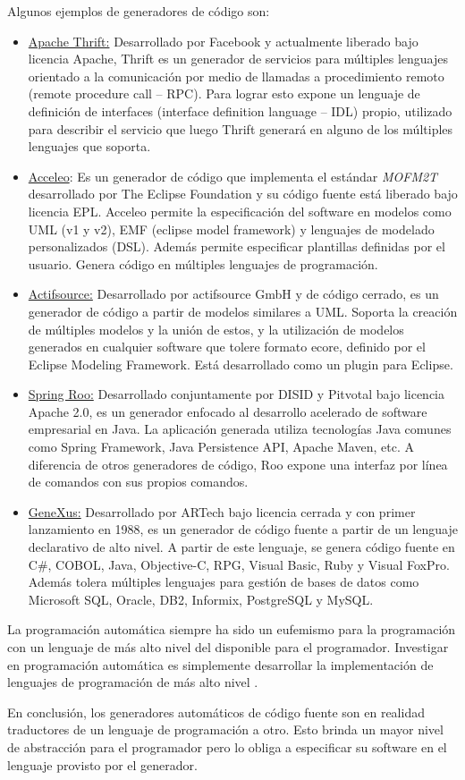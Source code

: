 Algunos ejemplos de generadores de código son:
\begin{itemize}
  \item \underline{Apache Thrift:} Desarrollado por Facebook y actualmente
  liberado bajo licencia Apache, Thrift es un generador de servicios para múltiples lenguajes
  orientado a la comunicación por medio de llamadas a procedimiento remoto
  (remote procedure call – RPC). Para lograr esto expone un lenguaje de
  definición de interfaces (interface definition language – IDL) propio,
  utilizado para describir el servicio que luego Thrift generará en alguno de
  los múltiples lenguajes que soporta.\cite{ApacheThrift}
  \item \underline{Acceleo}: Es un generador de código que implementa el
  estándar \textit{MOFM2T} desarrollado por The Eclipse Foundation y su código fuente
  está liberado bajo licencia EPL. Acceleo permite la especificación del
  software en modelos como UML (v1 y v2), EMF (eclipse model framework) y
  lenguajes de modelado personalizados (DSL). Además permite especificar
  plantillas definidas por el usuario. Genera código en múltiples lenguajes de
  programación.\cite{Acceleo}
  \item \underline{Actifsource:} Desarrollado por actifsource GmbH y de código
  cerrado, es un generador de código a partir de modelos similares a UML. Soporta la
  creación de múltiples modelos y la unión de estos, y la utilización de modelos
  generados en cualquier software que tolere formato ecore, definido por el
  Eclipse Modeling Framework. Está desarrollado como un plugin para
  Eclipse.\cite{Actifsource}
  \item \underline{Spring Roo:} Desarrollado conjuntamente por DISID y Pitvotal
  bajo licencia Apache 2.0, es un generador enfocado al desarrollo acelerado de
  software empresarial en Java. La aplicación generada utiliza tecnologías Java
  comunes como Spring Framework, Java Persistence API, Apache Maven, etc. A
  diferencia de otros generadores de código, Roo expone una interfaz por línea
  de comandos con sus propios comandos.\cite{SpringRoo}
  \item \underline{GeneXus:} Desarrollado por ARTech bajo licencia cerrada y con
  primer lanzamiento en 1988, es un generador de código fuente a partir de un
  lenguaje declarativo de alto nivel. A partir de este lenguaje, se genera
  código fuente en C\#, COBOL, Java, Objective-C, RPG, Visual Basic,
  Ruby y Visual FoxPro. Además tolera múltiples lenguajes para gestión de bases de
  datos como Microsoft SQL, Oracle, DB2, Informix, PostgreSQL y
  MySQL.\cite{Genexus}
  \end{itemize}
  
La programación automática siempre ha sido un eufemismo para la
programación con un lenguaje de más alto nivel del disponible para el
programador. Investigar en programación automática es simplemente desarrollar
la implementación de lenguajes de programación de más alto nivel
\cite{Parnas:1985:SAS:214956.214961}.

En conclusión, los generadores automáticos de código fuente son en realidad
traductores de un lenguaje de programación a otro. Esto brinda un mayor nivel
de abstracción para el programador pero lo obliga a especificar su software en
el lenguaje provisto por el generador.
